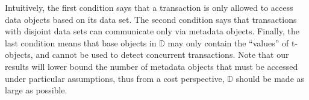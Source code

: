 \begin{definition}
\begin{enumerate}
%
\end{enumerate}
%
\end{definition}
%
Intuitively, the first condition says that a transaction is only
allowed to access data objects based on its data set. The second
condition says that transactions with disjoint data sets can
communicate only via metadata objects.
Finally, the last condition means that base objects in
$\mathbb{D}$ may only contain the ``values'' of t-objects, and cannot be used to detect concurrent transactions. Note that our results will lower bound the number of metadata objects that must be accessed under particular assumptions, thus from a cost perspective, $\mathbb{D}$ should be made as large as possible.
%
